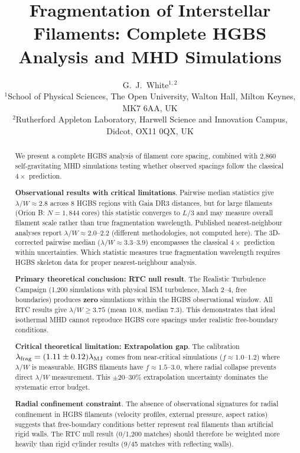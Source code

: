 \documentclass[twocolumn]{mnras}
\title{Fragmentation of Interstellar Filaments: Complete HGBS Analysis and MHD Simulations}
\author[G.~J.~White]{G.~J.~White$^{1,2}$\\
$^{1}$School of Physical Sciences, The Open University, Walton Hall, Milton Keynes, MK7 6AA, UK\\
$^{2}$Rutherford Appleton Laboratory, Harwell Science and Innovation Campus, Didcot, OX11 0QX, UK}
\begin{document}
\maketitle

\begin{abstract}
We present a complete HGBS analysis of filament core spacing, combined with 2,860 self-gravitating MHD simulations testing whether observed spacings follow the classical $4\times$ prediction.

\textbf{Observational results with critical limitations}. Pairwise median statistics give $\lambda/W \approx 2.8$ across 8 HGBS regions with Gaia DR3 distances, but for large filaments (Orion B: $N = 1,844$ cores) this statistic converges to $L/3$ and may measure overall filament scale rather than true fragmentation wavelength. Published nearest-neighbour analyses report $\lambda/W \approx 2.0$--$2.2$ (different methodologies, not computed here). The 3D-corrected pairwise median ($\lambda/W \approx 3.3$--$3.9$) encompasses the classical $4\times$ prediction within uncertainties. Which statistic measures true fragmentation wavelength requires HGBS skeleton data for proper nearest-neighbour analysis.

\textbf{Primary theoretical conclusion: RTC null result}. The Realistic Turbulence Campaign (1,200 simulations with physical ISM turbulence, Mach 2--4, free boundaries) produces \textbf{zero} simulations within the HGBS observational window. All RTC results give $\lambda/W \geq 3.75$ (mean 10.8, median 7.3). This demonstrates that ideal isothermal MHD cannot reproduce HGBS core spacings under realistic free-boundary conditions.

\textbf{Critical theoretical limitation: Extrapolation gap}. The calibration $\lambda_{\rm frag} = (1.11 \pm 0.12)\lambda_{\rm MJ}$ comes from near-critical simulations ($f \approx 1.0$--$1.2$) where $\lambda/W$ is measurable. HGBS filaments have $f \approx 1.5$--$3.0$, where radial collapse prevents direct $\lambda/W$ measurement. This $\pm$20--30\% extrapolation uncertainty dominates the systematic error budget.

\textbf{Radial confinement constraint}. The absence of observational signatures for radial confinement in HGBS filaments (velocity profiles, external pressure, aspect ratios) suggests that free-boundary conditions better represent real filaments than artificial rigid walls. The RTC null result (0/1,200 matches) should therefore be weighted more heavily than rigid cylinder results (9/45 matches with reflecting walls).


\end{abstract}
\end{document}
